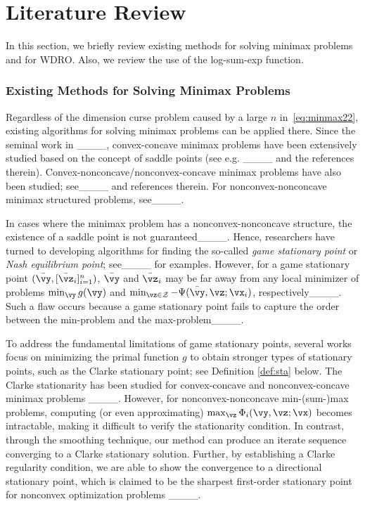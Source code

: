 \section{Literature Review}
\label{sec:liter}
	
	In this section, we briefly review %
	existing methods for solving minimax problems %
	and for WDRO. Also, we review the use of the log-sum-exp function. %
	
	\subsubsection{Existing Methods for Solving Minimax Problems}
	Regardless of the dimension curse problem caused by a large $n$ in~\eqref{eq:minmax22}, existing algorithms for solving minimax problems can be applied there.
	Since the seminal work in ____, convex-concave minimax problems have been extensively studied based on the concept of saddle points (see e.g. ____ and the references therein). 
	Convex-nonconcave/nonconvex-concave minimax problems have also been studied; see____ and references therein. For nonconvex-nonconcave minimax structured problems, see____. 
	
	In cases where the minimax problem has a nonconvex-nonconcave structure, the existence of a saddle point is not guaranteed____. 
	Hence, researchers have turned to developing algorithms for finding the so-called \emph{game stationary point} or \textit{Nash equilibrium point}; see____ for examples.  
	However, for a game stationary  point $(\bar{\vy}, [\bar{\vz}_i]^n_{i=1})$, $\bar{\vy}$ and $\bar{\vz}_i$ may be far away from any local minimizer of problems $\min_{\vy}g(\vy)$ and $\min_{\vz\in\mathcal{Z}}-\Psi(\bar{ \vy},\vz;\vx_i)$, respectively____. Such a flaw occurs because a game stationary point fails to capture the order between the min-problem and the max-problem____.  
	
	To address the fundamental limitations of game stationary points, several works focus on minimizing the primal function $g$ to obtain %
	stronger types of stationary points, such as the Clarke stationary point; see Definition \ref{def:sta} below. %
	The Clarke stationarity  
	has been %
	studied for convex-concave and nonconvex-concave minimax problems ____. However, for nonconvex-nonconcave min-(sum-)max problems, computing (or even approximating) $\max_{\vz}\Phi_i(\vy,\vz;\vx)$ becomes intractable, making it difficult to verify the stationarity condition. In contrast, through the smoothing technique, our method can produce an iterate sequence converging to a Clarke stationary solution. Further, by establishing a Clarke regularity condition, we are able to show the convergence to a directional stationary point, which is claimed to be the sharpest first-order stationary point for nonconvex optimization problems ____.
	
